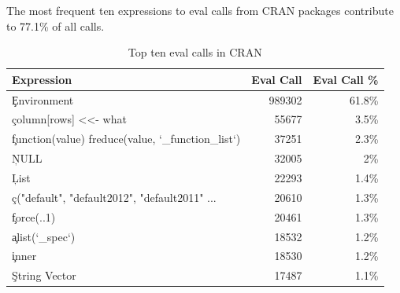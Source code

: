 \documentclass[conference]{IEEEtran}
\begin{document}
The most frequent ten expressions to eval calls from CRAN packages contribute to
77.1\% of all \eval calls.
\begin{table}[tb]
  \centering
  \begin{tabular}{l|rr} \hline
    Expression & Eval Call & Eval Call \% \\\hline
    \c{Environment} &                                                              989302   & 61.8\%\\
    \c{column[rows] <<- what} &                                                    55677    & 3.5\%\\
    \c{function(value) freduce(value, `_function_list`)} &                         37251    & 2.3\%\\
    \c{NULL} &                         32005    & 2\%\\
    \c{List} &                         22293    & 1.4\%\\
    \c{c("default", "default2012", "default2011" ...}&                             20610    & 1.3\%\\
    \c{force(..1)}                                        &                        20461    & 1.3\%\\
    \c{alist(`_spec`)}                                   &                         18532    & 1.2\%\\
    \c{inner}                                           &                          18530    & 1.2\%\\
    \c{String Vector}                           &                           17487     & 1.1\%\\
  \end{tabular}
  \caption{Top ten eval calls in CRAN}
  \label{A}
\end{table}
\end{document}
